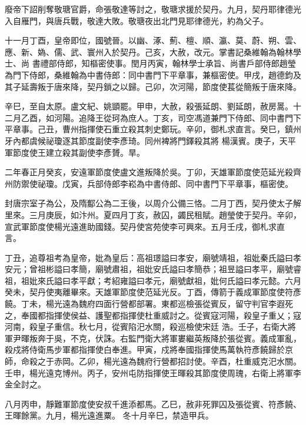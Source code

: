 \begin{pinyinscope}
 廢帝下詔削奪敬瑭官爵，命張敬達等討之，敬瑭求援於契丹。九月，契丹耶律德光入自雁門，與唐兵戰，敬達大敗。敬瑭夜出北門見耶律德光，約為父子。



 十一月丁酉，皇帝即位，國號晉。以幽、涿、薊、檀、順、瀛、莫、蔚、朔、雲、應、新、媯、儒、武、寰州入於契丹。己亥，大赦，改元。掌書記桑維翰為翰林學士、尚
 書禮部侍郎，知樞密使事。閏月丙寅，翰林學士承旨、尚書戶部侍郎趙瑩為門下侍郎，桑維翰為中書侍郎：同中書門下平章事，兼樞密使。甲戌，趙德鈞及其子延壽叛于唐來降，契丹鎖之以歸。己卯，次河陽，節度使萇從簡叛于唐來降。



 辛巳，至自太原。盧文紀、姚顗罷。甲申，大赦，殺張延朗、劉延朗，赦房暠。十二月乙酉，如河陽。追降王從珂為庶人。丁亥，司空馮道兼門下侍郎、同中書門下平章事。己丑，曹州指揮使石重立殺其刺史鄭玩。辛卯，御札求直言。癸巳，鎮州牙內都虞候祕瓊逐其節度副使李彥琦。同州裨將門鐸殺其將
 楊漢賓。庚子，天平軍節度使王建立殺其副使李彥贇。旱。



 二年春正月癸亥，安遠軍節度使盧文進叛降於吳。丁卯，天雄軍節度使范延光殺齊州防禦使祕瓊。戊寅，兵部侍郎李崧為中書侍郎、同中書門下平章事，樞密使。



 封唐宗室子為公，及隋酅公為二王後，以周介公備三恪。二月丁西，契丹使太子解里來。三月庚辰，如汴州。夏四月丁亥，赦囚，蠲民租賦。趙瑩使于契丹。辛卯，宣武軍節度使楊光遠進助國錢。契丹使宮苑使李可興來。五月壬戌，御札求直
 言。



 丁丑，追尊祖考為皇帝，妣為皇后：高祖璟謚曰孝安，廟號靖祖，祖妣秦氏謚曰孝安元；曾祖彬謚曰孝簡，廟號肅祖，祖妣安氏謚曰孝簡恭；祖昱謚曰孝平，廟號睿祖，祖妣來氏謚曰孝平獻；考紹雍謚曰孝元，廟號獻祖，妣何氏謚曰孝元懿。六月癸未，契丹使夷離畢來。天雄軍節度使范延光反。丁酉，傳箭于義成軍節度使符彥饒。丁未，楊光遠為魏府四面行營都部署。東都巡檢張從賓反，留守判官李遐死之，奉國都指揮使侯益、護聖都指揮使杜重威討之。從賓寇河陽，殺皇子重乂；寇河南，殺皇子重信。秋七月，從賓陷汜水關，殺巡檢使宋廷
 浩。壬子，右衛大將軍尹暉叛奔于吳，不克，伏誅。右監門衛大將軍婁繼英叛降於張從賓。義成軍亂，殺戍將侍衛馬步軍都指揮使白奉進。甲寅，戍將奉國指揮使馬萬執符彥饒歸於京師，命殺之于赤岡。乙卯，楊光遠為魏府行營都招討使。辛酉，杜重威克汜水關。壬申，楊光遠克博州。丙子，安州屯防指揮使王暉殺其節度使周瑰，右衛上將軍李金全討之。



 八月丙申，靜難軍節度使安叔千進添都馬。乙巳，赦非死罪囚及張從賓、符彥饒、王暉餘黨。九月，楊光遠進粟。
 冬十月辛巳，禁造甲兵。




\end{pinyinscope}
